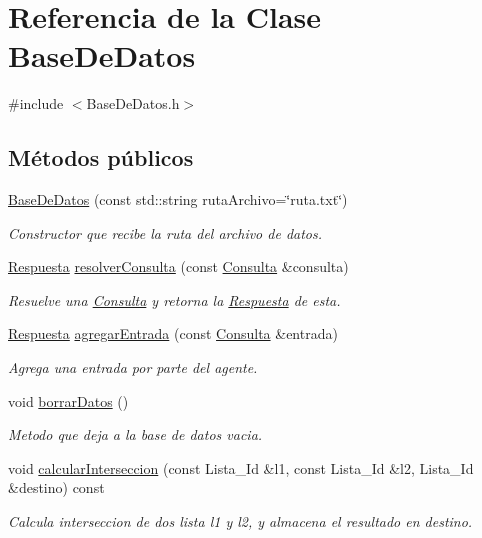 \hypertarget{classBaseDeDatos}{\section{\-Referencia de la \-Clase \-Base\-De\-Datos}
\label{classBaseDeDatos}
}


{\ttfamily \#include $<$\-Base\-De\-Datos.\-h$>$}

\subsection*{\-Métodos públicos}
\begin{DoxyCompactItemize}
\item 
\hyperlink{classBaseDeDatos_ae221c6a11843aa762f30cb132827a432}{\-Base\-De\-Datos} (const std\-::string ruta\-Archivo=\char`\"{}ruta.\-txt\char`\"{})
\begin{DoxyCompactList}\small\item\em \-Constructor que recibe la ruta del archivo de datos. \end{DoxyCompactList}\item 
\hyperlink{classRespuesta}{\-Respuesta} \hyperlink{classBaseDeDatos_a5869d6fbcbb68f45c9d5d585c6aabc89}{resolver\-Consulta} (const \hyperlink{classConsulta}{\-Consulta} \&consulta)
\begin{DoxyCompactList}\small\item\em \-Resuelve una \hyperlink{classConsulta}{\-Consulta} y retorna la \hyperlink{classRespuesta}{\-Respuesta} de esta. \end{DoxyCompactList}\item 
\hyperlink{classRespuesta}{\-Respuesta} \hyperlink{classBaseDeDatos_a890f098afb8946ad045e908ae2146cbf}{agregar\-Entrada} (const \hyperlink{classConsulta}{\-Consulta} \&entrada)
\begin{DoxyCompactList}\small\item\em \-Agrega una entrada por parte del agente. \end{DoxyCompactList}\item 
\hypertarget{classBaseDeDatos_a4563aa915fd3d0a878f49ff14573c7a5}{void \hyperlink{classBaseDeDatos_a4563aa915fd3d0a878f49ff14573c7a5}{borrar\-Datos} ()}\label{classBaseDeDatos_a4563aa915fd3d0a878f49ff14573c7a5}

\begin{DoxyCompactList}\small\item\em \-Metodo que deja a la base de datos vacia. \end{DoxyCompactList}\item 
void \hyperlink{classBaseDeDatos_ae35b96b6ef743328f6a3d1a64832b971}{calcular\-Interseccion} (const \-Lista\-\_\-\-Id \&l1, const \-Lista\-\_\-\-Id \&l2, \-Lista\-\_\-\-Id \&destino) const 
\begin{DoxyCompactList}\small\item\em \-Calcula interseccion de dos lista l1 y l2, y almacena el resultado en destino. \end{DoxyCompactList}\end{DoxyCompactItemize}


